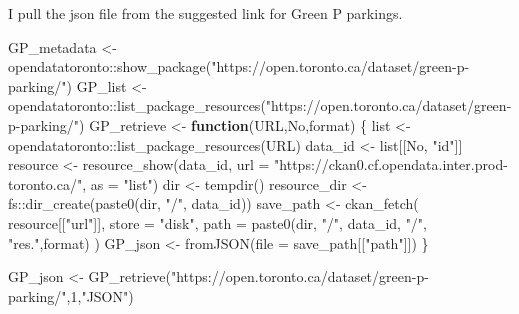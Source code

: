\documentclass[
]{article}
\newenvironment{Shaded}{\begin{snugshade}}{\end{snugshade}}
\newcommand{\AttributeTok}[1]{\textcolor[rgb]{0.77,0.63,0.00}{#1}}
\newcommand{\ControlFlowTok}[1]{\textcolor[rgb]{0.13,0.29,0.53}{\textbf{#1}}}
\newcommand{\DecValTok}[1]{\textcolor[rgb]{0.00,0.00,0.81}{#1}}
\newcommand{\FunctionTok}[1]{\textcolor[rgb]{0.00,0.00,0.00}{#1}}
\newcommand{\NormalTok}[1]{#1}
\newcommand{\OtherTok}[1]{\textcolor[rgb]{0.56,0.35,0.01}{#1}}
\newcommand{\SpecialCharTok}[1]{\textcolor[rgb]{0.00,0.00,0.00}{#1}}
\newcommand{\StringTok}[1]{\textcolor[rgb]{0.31,0.60,0.02}{#1}}
\begin{document}
I pull the json file from the suggested link for Green P parkings.

\begin{Shaded}
\begin{Highlighting}[]
\NormalTok{GP\_metadata }\OtherTok{\textless{}{-}}\NormalTok{ opendatatoronto}\SpecialCharTok{::}\FunctionTok{show\_package}\NormalTok{(}\StringTok{"https://open.toronto.ca/dataset/green{-}p{-}parking/"}\NormalTok{)}
\NormalTok{GP\_list }\OtherTok{\textless{}{-}}\NormalTok{ opendatatoronto}\SpecialCharTok{::}\FunctionTok{list\_package\_resources}\NormalTok{(}\StringTok{"https://open.toronto.ca/dataset/green{-}p{-}parking/"}\NormalTok{)}
\NormalTok{GP\_retrieve }\OtherTok{\textless{}{-}} \ControlFlowTok{function}\NormalTok{(URL,No,format) \{}
\NormalTok{  list }\OtherTok{\textless{}{-}}\NormalTok{ opendatatoronto}\SpecialCharTok{::}\FunctionTok{list\_package\_resources}\NormalTok{(URL)}
\NormalTok{  data\_id }\OtherTok{\textless{}{-}}\NormalTok{ list[[No, }\StringTok{"id"}\NormalTok{]]}
\NormalTok{  resource }\OtherTok{\textless{}{-}}
    \FunctionTok{resource\_show}\NormalTok{(data\_id, }\AttributeTok{url =} \StringTok{"https://ckan0.cf.opendata.inter.prod{-}toronto.ca/"}\NormalTok{, }\AttributeTok{as =} \StringTok{"list"}\NormalTok{)}
\NormalTok{  dir }\OtherTok{\textless{}{-}} \FunctionTok{tempdir}\NormalTok{()}
\NormalTok{  resource\_dir }\OtherTok{\textless{}{-}}\NormalTok{ fs}\SpecialCharTok{::}\FunctionTok{dir\_create}\NormalTok{(}\FunctionTok{paste0}\NormalTok{(dir, }\StringTok{"/"}\NormalTok{, data\_id))}
\NormalTok{  save\_path }\OtherTok{\textless{}{-}}
    \FunctionTok{ckan\_fetch}\NormalTok{(}
\NormalTok{      resource[[}\StringTok{"url"}\NormalTok{]],}
      \AttributeTok{store =} \StringTok{"disk"}\NormalTok{,}
      \AttributeTok{path =} \FunctionTok{paste0}\NormalTok{(dir, }\StringTok{"/"}\NormalTok{, data\_id, }\StringTok{"/"}\NormalTok{, }\StringTok{"res."}\NormalTok{,format)}
\NormalTok{    )}
\NormalTok{  GP\_json }\OtherTok{\textless{}{-}} \FunctionTok{fromJSON}\NormalTok{(}\AttributeTok{file =}\NormalTok{ save\_path[[}\StringTok{"path"}\NormalTok{]])}
\NormalTok{\}}

\NormalTok{GP\_json }\OtherTok{\textless{}{-}} \FunctionTok{GP\_retrieve}\NormalTok{(}\StringTok{"https://open.toronto.ca/dataset/green{-}p{-}parking/"}\NormalTok{,}\DecValTok{1}\NormalTok{,}\StringTok{"JSON"}\NormalTok{)}


\end{Highlighting}
\end{Shaded}
\end{document}
